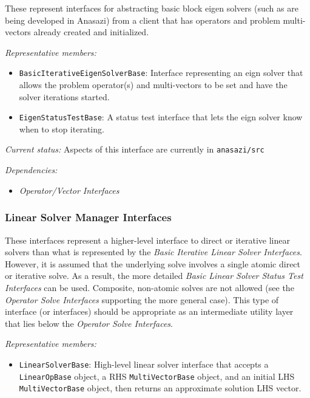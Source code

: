 \documentclass[pdf,ps2pdf,11pt]{SANDreport}
\begin{document}
These represent interfaces for abstracting basic block eigen solvers (such as
are being developed in Anasazi) from a client that has operators and problem
multi-vectors already created and initialized.

{}\textit{Representative members:}
\begin{itemize}
%
{}\item {}\texttt{BasicIterativeEigenSolverBase}: Interface representing an eign
solver that allows the problem operator(s) and multi-vectors to be set and
have the solver iterations started.
%
{}\item {}\texttt{EigenStatusTestBase}: A status test interface that lets the eign
solver know when to stop iterating.
%
\end{itemize}

{}\textit{Current status:} Aspects of this interface are currently in
{}\texttt{anasazi/src}

{}\textit{Dependencies:}
\begin{itemize}
\item {}\textit{Operator/Vector Interfaces}
\end{itemize}
%
\subsubsection{Linear Solver Manager Interfaces}
%

These interfaces represent a higher-level interface to direct or iterative
linear solvers than what is represented by the {}\textit{Basic Iterative
Linear Solver Interfaces}.  However, it is assumed that the underlying solve
involves a single atomic direct or iterative solve.  As a result, the more
detailed {}\textit{Basic Linear Solver Status Test Interfaces} can be used.
Composite, non-atomic solves are not allowed (see the {}\textit{Operator Solve
Interfaces} supporting the more general case).  This type of interface (or
interfaces) should be appropriate as an intermediate utility layer that lies
below the {}\textit{Operator Solve Interfaces}.

{}\textit{Representative members:}
\begin{itemize}
%
{}\item {}\texttt{LinearSolverBase}: High-level linear solver interface that
accepts a {}\texttt{Linear\-Op\-Base} object, a RHS
{}\texttt{Multi\-Vector\-Base} object, and an initial LHS
{}\texttt{Multi\-Vector\-Base} object, then returns an approximate solution
LHS vector.
%
\end{itemize}
\end{document}
